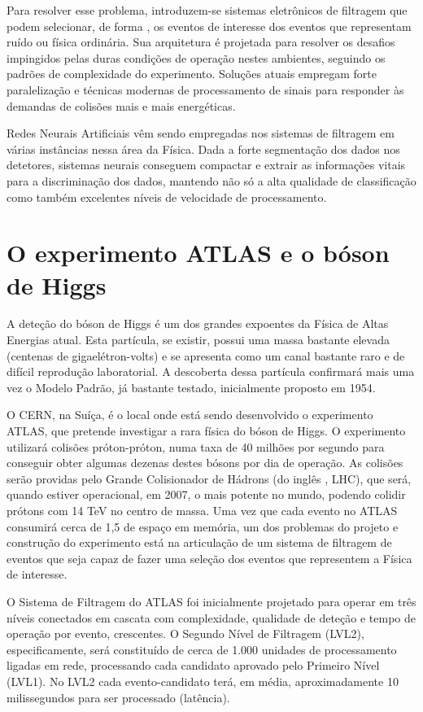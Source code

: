 Para resolver esse problema, introduzem-se sistemas eletrônicos de filtragem
que podem selecionar, de forma , os eventos de interesse dos
eventos que representam ruído ou física ordinária. Sua arquitetura é projetada
para resolver os desafios impingidos pelas duras condições de operação nestes
ambientes, seguindo os padrões de complexidade do experimento. Soluções atuais
empregam forte paralelização e técnicas modernas de processamento de sinais
para responder às demandas de colisões mais e mais energéticas.

Redes Neurais Artificiais vêm sendo empregadas nos sistemas de filtragem em
várias instâncias nessa área da Física. Dada a forte segmentação dos dados nos
detetores, sistemas neurais conseguem compactar e extrair as informações
vitais para a discriminação dos dados, mantendo não só a alta qualidade de
classificação como também excelentes níveis de velocidade de processamento.

\section{O experimento ATLAS e o bóson de Higgs}

A deteção do bóson de Higgs é um dos grandes expoentes da Física de Altas
Energias atual. Esta partícula, se existir, possui uma massa bastante elevada
(centenas de gigaelétron-volts) e se apresenta como um canal bastante raro e
de difícil reprodução laboratorial. A descoberta dessa partícula confirmará
mais uma vez o Modelo Padrão, já bastante testado, inicialmente proposto em
1954.

O CERN, na Suíça, é o local onde está sendo desenvolvido o experimento ATLAS,
que pretende investigar a rara física do bóson de Higgs. O experimento
utilizará colisões próton-próton, numa taxa de 40 milhões por segundo para
conseguir obter algumas dezenas destes bósons por dia de operação. As colisões
serão providas pelo Grande Colisionador de Hádrons (do inglês , LHC), que será, quando estiver operacional, em 2007, o mais
potente no mundo, podendo colidir prótons com 14 TeV no centro de massa. Uma
vez que cada evento no ATLAS consumirá cerca de 1,5  de espaço
em memória, um dos problemas do projeto e construção do experimento está na
articulação de um sistema de filtragem de eventos que seja capaz de fazer uma
seleção  dos eventos que representem a Física de interesse.

O Sistema de Filtragem do ATLAS foi inicialmente projetado para
operar em três níveis conectados em cascata com complexidade, qualidade de
deteção e tempo de operação por evento, crescentes. O Segundo Nível de
Filtragem (LVL2), especificamente, será constituído de cerca de 1.000 unidades
de processamento ligadas em rede, processando cada candidato aprovado pelo
Primeiro Nível (LVL1). No LVL2 cada evento-candidato terá, em média,
aproximadamente 10 milissegundos para ser processado (latência).

